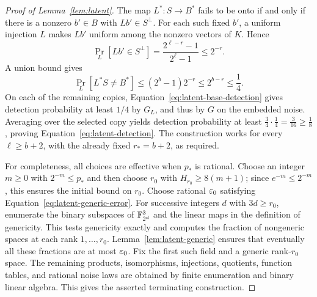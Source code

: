 \begin{proof}[Proof of Lemma~\ref{lem:latent}]
The map $L^*:S\to B^*$ fails to be onto if and only if there is a
nonzero $b'\in B$ with $Lb'\in S^\perp$.  For each such fixed $b'$, a
uniform injection $L$ makes $Lb'$ uniform among the nonzero vectors of
$K$.  Hence
\[
 \Pr_L[Lb'\in S^\perp]
 =\frac{2^{\ell-r}-1}{2^\ell-1}
 \le2^{-r}.
\]
A union bound gives
\[
 \Pr_L[L^*S\ne B^*]
 \le(2^b-1)2^{-r}
 \le2^{b-r}\le\frac14.
\]
On each of the remaining copies,
Equation~\eqref{eq:latent-base-detection} gives detection probability at
least $1/4$ by $G_L$, and thus by $G$ on the embedded noise.
Averaging over the selected copy yields detection probability at least
$\frac34\cdot\frac14=\frac{3}{16}\ge\frac18$, proving
Equation~\eqref{eq:latent-detection}.
The construction works for every $\ell\ge b+2$, with the already fixed
$r_*=b+2$, as required.

For completeness, all choices are effective when $p_*$ is rational.
Choose an integer $m\ge0$ with $2^{-m}\le p_*$ and then choose $r_0$ with
$H_{r_0}\ge8(m+1)$; since $e^{-m}\le2^{-m}$, this ensures the initial
bound on $r_0$.  Choose rational $\varepsilon_0$ satisfying
Equation~\eqref{eq:latent-generic-error}.  For successive integers $d$ with
$3d\ge r_0$, enumerate the binary subspaces of $\mathbb F_{2^d}^3$ and the linear
maps in the definition of genericity.  This tests genericity exactly and
computes the fraction of nongeneric spaces at each rank $1,\ldots,r_0$.
Lemma~\ref{lem:latent-generic} ensures that eventually all these fractions
are at most $\varepsilon_0$.  Fix the first such field and a generic rank-$r_0$
space.  The remaining products, isomorphisms, injections, quotients, function
tables, and rational noise laws are obtained by finite enumeration and
binary linear algebra.  This gives the asserted terminating construction.
\end{proof}
